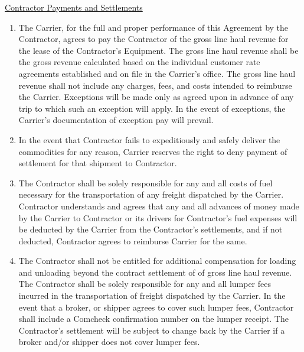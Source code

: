 \underline{Contractor Payments and Settlements}
\begin{enumerate}[ 
    ref = \SecondLevelEnumerator
]
    \item The Carrier, for the full and proper performance of this
    Agreement by the Contractor, agrees to pay the Contractor
    {\bfseries \GrossRevenueCommision} of the gross line haul revenue for
    the lease of the Contractor's Equipment. The gross line haul revenue
    shall be the gross revenue calculated based on the individual customer
    rate agreements established and on file in the Carrier's office. The
    gross line haul revenue shall not include any charges, fees, and costs
    intended to reimburse the Carrier. Exceptions will be made only as
    agreed upon in advance of any trip to which such an exception will
    apply. In the event of exceptions, the Carrier's documentation of
    exception pay will prevail.

    \item In the event that Contractor fails to expeditiously and safely
    deliver the commodities for any reason, Carrier reserves the right to
    deny payment of settlement for that shipment to Contractor.

    \item The Contractor shall be solely responsible for any and all costs
    of fuel necessary for the transportation of any freight dispatched by
    the Carrier. Contractor understands and agrees that any and all
    advances of money made by the Carrier to Contractor or its drivers for
    Contractor's fuel expenses will be deducted by the Carrier from the
    Contractor's settlements, and if not deducted, Contractor agrees to
    reimburse Carrier for the same.

    \item{\label{terms:requirements-and-obligations}} The Contractor shall
    not be entitled for additional compensation for loading and unloading
    beyond the contract settlement of {\bfseries \GrossRevenueCommision} of
    gross line haul revenue. The Contractor shall be solely responsible for
    any and all lumper fees incurred in the transportation of freight
    dispatched by the Carrier. In the event that a broker, or shipper
    agrees to cover such lumper fees, Contractor shall include a Comcheck
    confirmation number on the lumper receipt. The Contractor's settlement
    will be subject to change back by the Carrier if a broker and/or
    shipper does not cover lumper fees.


\end{enumerate}
